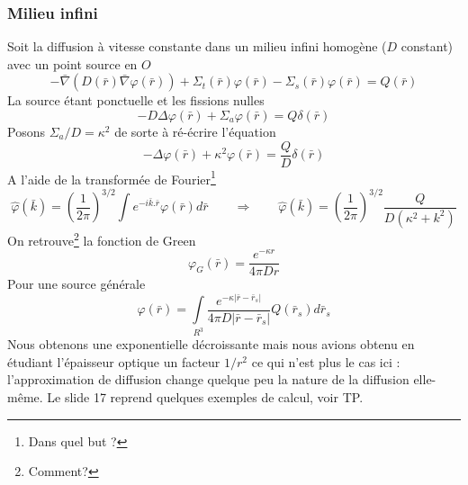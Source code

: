 \subsubsection{Milieu infini}
Soit la diffusion à vitesse constante dans un milieu infini homogène ($D$ constant) avec un point
source en $O$
\begin{equation}
 - \bar \nabla (D(\bar r)\bar \nabla \varphi (\bar r)) + {\Sigma _t}(\bar r)\varphi (\bar r) - {\Sigma _s}(\bar r)\varphi (\bar r) = Q(\bar r)
\end{equation}
La source étant ponctuelle et les fissions nulles
\begin{equation}
 - D\Delta \varphi (\bar r) + {\Sigma _a}\varphi (\bar r) = Q\delta (\bar r)
\end{equation}
Posons ${\Sigma _a}/D = {\kappa ^2}$ de sorte à ré-écrire l'équation
\begin{equation}
 - \Delta \varphi (\bar r) + {\kappa ^2}\varphi (\bar r) = \frac{Q}{D}\delta (\bar r)
\end{equation}
A l'aide de la transformée de Fourier\footnote{Dans quel but ?}
\begin{equation}
\hat \varphi (\bar k) = {\left( {\frac{1}{{2\pi }}} \right)^{3/2}}\int   {e^{ - i\bar k.\bar r}}\varphi (\bar r)d\bar r\qquad\Rightarrow\qquad \hat \varphi (\bar k) = {\left( {\frac{1}{{2\pi }}} \right)^{3/2}}\frac{Q}{{D({\kappa ^2} + {k^2})}}
\end{equation}
On retrouve\footnote{Comment?} la fonction de Green
\begin{equation}
{\varphi _G}(\bar r) = \frac{{{e^{ - \kappa r}}}}{{4\pi Dr}}
\end{equation}
Pour une source générale
\begin{equation}
\varphi (\bar r) = \int\limits_{{R^3}}    \frac{{{e^{ - \kappa |\bar r - {{\bar r}_s}|}}}}{{4\pi D|\bar r - {{\bar r}_s}|}}Q({\bar r_s})d{\bar r_s}
\end{equation}
Nous obtenons une exponentielle décroissante mais nous avions obtenu en étudiant l'épaisseur optique
un facteur $1/r^2$ ce qui n'est plus le cas ici : l'approximation de diffusion change quelque peu 
la nature de la diffusion elle-même. Le slide 17 reprend quelques exemples de calcul, voir TP.

